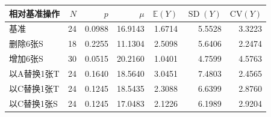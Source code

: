 \begin{tabular}{lrrrrrr}
\toprule
相对基准操作 & $N$ & $p$ & $\mu$ & $\mathbb E(Y)$ & $\operatorname{SD}(Y)$ & $\mathrm{CV}(Y)$ \\
\midrule
基准 & 24 & 0.0988 & 16.9143 & 1.6714 & 5.5528 & 3.3223 \\
删除6张S & 18 & 0.2255 & 11.1304 & 2.5098 & 5.6406 & 2.2474 \\
增加6张S & 30 & 0.0515 & 20.2160 & 1.0401 & 4.7599 & 4.5763 \\
以A替换1张T & 24 & 0.1640 & 18.5640 & 3.0451 & 7.4803 & 2.4565 \\
以C替换1张T & 24 & 0.1245 & 18.5435 & 2.3088 & 6.6399 & 2.8760 \\
以C替换1张S & 24 & 0.1245 & 17.0483 & 2.1226 & 6.1989 & 2.9204 \\
\bottomrule
\end{tabular}
